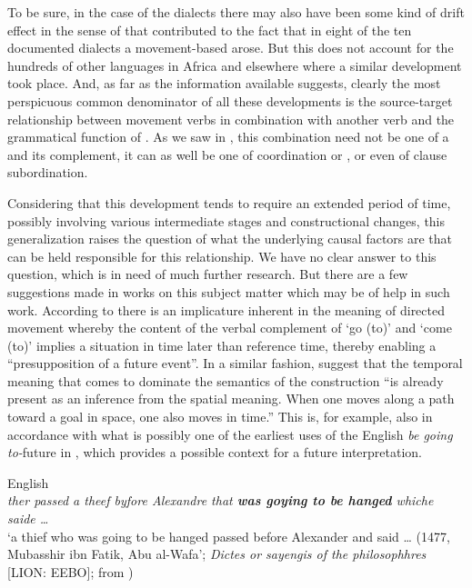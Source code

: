 \documentclass[output=paper]{langsci/langscibook}
\begin{document}
  To be sure, in the case of the  dialects there may also have been some kind of drift effect in the sense of \citet{Sapir1921} that contributed to the fact that in eight of the ten documented dialects a movement-based  arose. But this does not account for the hundreds of other languages in Africa and elsewhere where a similar development took place. And, as far as the information available suggests, clearly the most perspicuous common denominator of all these developments is the source-target relationship between  movement verbs in combination with another verb and the grammatical function of . As we saw in , this combination need not be one of a  and its complement, it can as well be one of coordination or , or even of clause subordination. 



  Considering that this development tends to require an extended period of time, possibly involving various intermediate stages and constructional changes, this generalization raises the question of what the underlying causal factors are that can be held responsible for this relationship. We have no clear answer to this question, which is in need of much further research. But there are a few suggestions made in works on this subject matter which may be of help in such work. According to \citet[109]{Hilpert2008} there is an implicature inherent in the meaning of directed movement whereby the content of the verbal complement of ‘go (to)’ and ‘come (to)’ implies a situation in time later than reference time, thereby enabling a “presupposition of a future event”. In a similar fashion, \citet[268]{BybeeEtAl1994} suggest that the temporal meaning that comes to dominate the semantics of the construction ``is already present as an inference from the spatial meaning. When one moves along a path toward a goal in space, one also moves in time.'' This is, for example, also in accordance with what is possibly one of the earliest uses of the English \textit{be going to-}future in , which provides a possible context for a future interpretation.



\ea%
    \label{ex:heine:16} 
         English\\
  \textit{ther passed a theef byfore Alexandre that \textbf{was goying to be hanged} whiche saide …}\\
\glt  ‘a thief who was going to be hanged passed before Alexander and said … 
  (1477, Mubasshir ibn Fatik, Abu al-Wafa’; \textit{Dictes or sayengis of the philosophhres} [LION: EEBO]; from \citealt{Traugott2012})
\z
\end{document}
